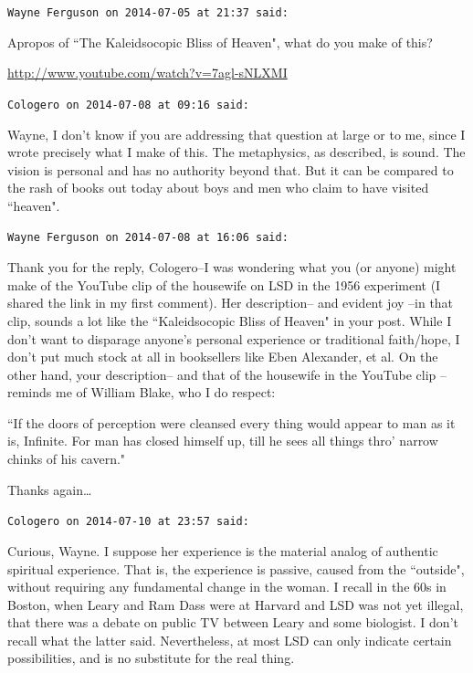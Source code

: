 \begin{footnotesize}\begin{sffamily}



\texttt{Wayne Ferguson on 2014-07-05 at 21:37 said: }

Apropos of ``The Kaleidsocopic Bliss of Heaven", what do you make of this?

\url{http://www.youtube.com/watch?v=7agl-sNLXMI}


\hfill

\texttt{Cologero on 2014-07-08 at 09:16 said: }

Wayne, I don't know if you are addressing that question at large or to me, since I wrote precisely what I make of this. The metaphysics, as described, is sound. The vision is personal and has no authority beyond that. But it can be compared to the rash of books out today about boys and men who claim to have visited ``heaven".


\hfill

\texttt{Wayne Ferguson on 2014-07-08 at 16:06 said: }

Thank you for the reply, Cologero–I was wondering what you (or anyone) might make of the YouTube clip of the housewife on LSD in the 1956 experiment (I shared the link in my first comment). Her description– and evident joy –in that clip, sounds a lot like the ``Kaleidsocopic Bliss of Heaven" in your post. While I don't want to disparage anyone's personal experience or traditional faith/hope, I don't put much stock at all in booksellers like Eben Alexander, et al. On the other hand, your description– and that of the housewife in the YouTube clip –reminds me of William Blake, who I do respect:

``If the doors of perception were cleansed every thing would appear to man as it is, Infinite. For man has closed himself up, till he sees all things thro' narrow chinks of his cavern." 

Thanks again…


\hfill

\texttt{Cologero on 2014-07-10 at 23:57 said: }

Curious, Wayne. I suppose her experience is the material analog of authentic spiritual experience. That is, the experience is passive, caused from the ``outside", without requiring any fundamental change in the woman. I recall in the 60s in Boston, when Leary and Ram Dass were at Harvard and LSD was not yet illegal, that there was a debate on public TV between Leary and some biologist. I don't recall what the latter said. Nevertheless, at most LSD can only indicate certain possibilities, and is no substitute for the real thing.



\end{sffamily}
\end{footnotesize}
